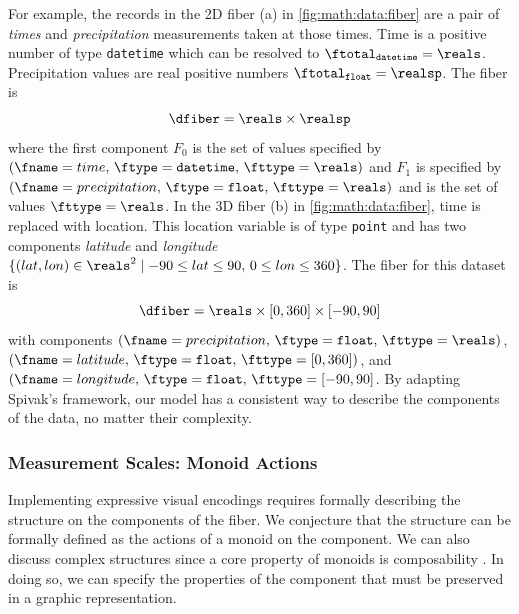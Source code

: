 \documentclass[../main.tex]{subfiles}
\begin{document}
For example, the records in the 2D fiber (a) in \autoref{fig:math:data:fiber} are a pair of \textit{times} and \textit{precipitation} measurements taken at those times. Time is a positive number of type \texttt{datetime} which can be resolved to $\ftotal_{\texttt{datetime}}= \reals$. Precipitation values are real positive numbers $\ftotal_{\texttt{float}} = \realsp$. The fiber is 
\begin{equation*}
    \dfiber =  \reals \times \realsp 
\end{equation*} 
where the first component $F_0$ is the set of values specified by $(\fname=time,\, \ftype=\texttt{datetime},\, \fttype=\reals)$ and $F_1$ is specified by $(\fname=precipitation,\, \ftype=\texttt{float},\, \fttype=\reals)$ and is the set of values $\fttype=\reals$. In the 3D fiber (b) in \autoref{fig:math:data:fiber}, time is replaced with location. This location variable is of type \texttt{point} and has two components \textit{latitude} and \textit{longitude} $\{(lat,lon) \in \reals^{2} \mid  -90\leq lat \leq 90,\, 0 \leq lon \leq 360\}$. The fiber for this dataset is
\begin{equation*}
    \dfiber = \reals \times \left[0, 360\right] \times \left[-90, 90\right]
\end{equation*} 
with components \((\fname=precipitation,\, \ftype=\texttt{float},\, \fttype=\reals)\), \((\fname=latitude,\, \ftype=\texttt{float}, \, \fttype=\left[0, 360\right])\), and \((\fname=longitude,\, \ftype=\texttt{float},\,\fttype= \left[-90, 90\right]\). By adapting Spivak's framework, our model has a consistent way to describe the components of the data, no matter their complexity. 

\subsubsection{Measurement Scales: Monoid Actions}
\label{sec:math:data:monoid}
Implementing expressive visual encodings requires formally describing the structure on the components of the fiber. We conjecture that the structure can be formally defined as the actions of a monoid on the component. We can also discuss complex structures since a core property of monoids is composability \cite{yorgeyMonoidsThemeVariations}. In doing so, we can specify the properties of the component that must be preserved in a graphic representation. 
\end{document}
